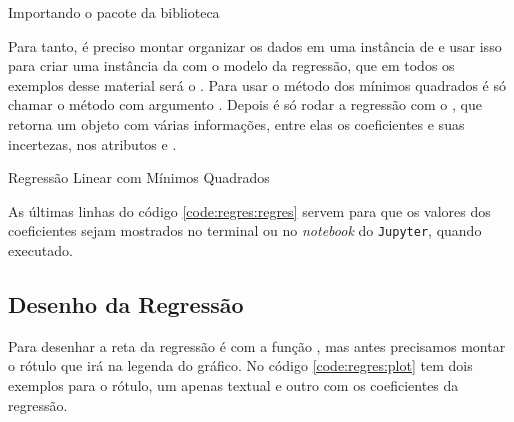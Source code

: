     \begin{listing}[H]
        \caption{Importando o pacote  da biblioteca \scipy}
        \label{code:regres:odr}

    \end{listing}

    Para tanto, é preciso montar organizar os dados em uma instância de \href{https://docs.scipy.org/doc/scipy/reference/generated/scipy.odr.RealData.html#scipy.odr.RealData}{} e usar isso para criar uma instância da \href{https://docs.scipy.org/doc/scipy/reference/generated/scipy.odr.ODR.html#scipy.odr.ODR}{} com o modelo da regressão, que em todos os exemplos desse material será o \href{https://docs.scipy.org/doc/scipy/reference/odr.html#scipy.odr.unilinear}{}. Para usar o método dos mínimos quadrados é só chamar o método \href{https://docs.scipy.org/doc/scipy/reference/generated/scipy.odr.ODR.set_job.html#scipy.odr.ODR.set_job}{} com argumento . Depois é só rodar a regressão com o \href{https://docs.scipy.org/doc/scipy/reference/generated/scipy.odr.ODR.run.html#scipy.odr.ODR.run}{}, que retorna um objeto \href{https://docs.scipy.org/doc/scipy/reference/generated/scipy.odr.Output.html#scipy.odr.Output}{} com várias informações, entre elas os coeficientes e suas incertezas, nos atributos  e .

    \begin{listing}[H]
        \caption{Regressão Linear com Mínimos Quadrados}
        \label{code:regres:regres}

    \end{listing}

    As últimas linhas do código \ref{code:regres:regres} servem para que os valores dos coeficientes sejam mostrados no terminal ou no \textit{notebook} do \texttt{Jupyter}, quando executado.


\subsection{Desenho da Regressão}

    Para desenhar a reta da regressão é com a função \href{https://matplotlib.org/3.1.0/api/_as_gen/matplotlib.pyplot.plot.html}{}, mas antes precisamos montar o rótulo que irá na legenda do gráfico. No código \ref{code:regres:plot} tem dois exemplos para o rótulo, um apenas textual e outro com os coeficientes da regressão.

